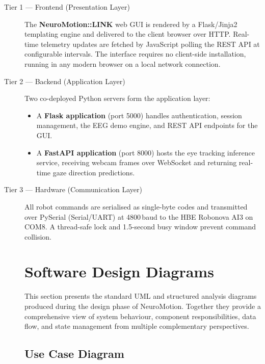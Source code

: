 \documentclass[12pt, a4paper, oneside]{report}
\begin{document}
\begin{description}
    \item[Tier 1 --- Frontend (Presentation Layer)]
    The \textbf{NeuroMotion::LINK} web GUI is rendered by a Flask/Jinja2 templating
    engine and delivered to the client browser over HTTP. Real-time telemetry updates
    are fetched by JavaScript polling the REST API at configurable intervals. The
    interface requires no client-side installation, running in any modern browser on a
    local network connection.

    \item[Tier 2 --- Backend (Application Layer)]
    Two co-deployed Python servers form the application layer:
    \begin{itemize}
      \item A \textbf{Flask application} (port 5000) handles authentication, session
            management, the EEG demo engine, and REST API endpoints for the GUI.
      \item A \textbf{FastAPI application} (port 8000) hosts the eye tracking
            inference service, receiving webcam frames over WebSocket and returning
            real-time gaze direction predictions.
    \end{itemize}

    \item[Tier 3 --- Hardware (Communication Layer)]
    All robot commands are serialised as single-byte codes and transmitted over
    PySerial (Serial/UART) at 4800\,baud to the HBE Robonova AI3 on COM8. A
    thread-safe lock and 1.5-second busy window prevent command collision.



\section{Software Design Diagrams}
\label{sec:design_diagrams}

This section presents the standard UML and structured analysis diagrams produced
during the design phase of NeuroMotion. Together they provide a comprehensive
view of system behaviour, component responsibilities, data flow, and state
management from multiple complementary perspectives.

\subsection{Use Case Diagram}


\end{description}
\end{document}
